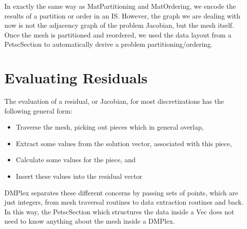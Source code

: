 {{In exactly the same way as MatPartitioning and MatOrdering, we encode the results of a partition or order in an
IS. However, the graph we are dealing with now is not the adjacency graph of the problem Jacobian, but the mesh
itself. Once the mesh is partitioned and reordered, we used the data layout from a PetscSection to automatically derive
a problem partitioning/ordering.

\section{Evaluating Residuals} 

The evaluation of a residual, or Jacobian, for most discretizations has the following general form:
\begin{itemize}
  \item Traverse the mesh, picking out pieces which in general overlap,

  \item Extract some values from the solution vector, associated with this piece,

  \item Calculate some values for the piece, and

  \item Insert these values into the residual vector
\end{itemize}
DMPlex separates these different concerns by passing sets of points, which are just integers, from mesh traversal
routines to data extraction routines and back. In this way, the PetscSection which structures the data inside a Vec does
not need to know anything about the mesh inside a DMPlex.

}}
